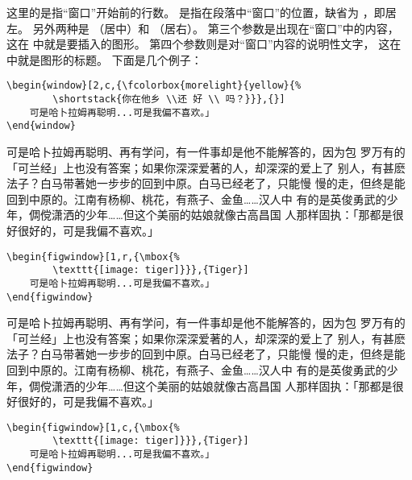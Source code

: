 这里的是指“窗口”开始前的行数。
是指在段落中“窗口”的位置，缺省为 ，即居左。
另外两种是 （居中）和 （居右）。
第三个参数是出现在“窗口”中的内容，
这在  中就是要插入的图形。
第四个参数则是对“窗口”内容的说明性文字，
这在  中就是图形的标题。
下面是几个例子：

\begin{Verbatim}
\begin{window}[2,c,{\fcolorbox{morelight}{yellow}{%
		\shortstack{你在他乡 \\还 好 \\ 吗？}}},{}]
	可是哈卜拉姆再聪明...可是我偏不喜欢。」
\end{window}
\end{Verbatim}

\begin{window}
	可是哈卜拉姆再聪明、再有学问，有一件事却是他不能解答的，因为包
	罗万有的「可兰经」上也没有答案；如果你深深爱著的人，却深深的爱上了
	别人，有甚麽法子？白马带著她一步步的回到中原。白马已经老了，只能慢
	慢的走，但终是能回到中原的。江南有杨柳、桃花，有燕子、金鱼……汉人中
	有的是英俊勇武的少年，倜傥潇洒的少年……但这个美丽的姑娘就像古高昌国
	人那样固执：「那都是很好很好的，可是我偏不喜欢。」
\end{window}

\begin{Verbatim}
\begin{figwindow}[1,r,{\mbox{%
		\texttt{[image: tiger]}}},{Tiger}]
	可是哈卜拉姆再聪明...可是我偏不喜欢。」
\end{figwindow}
\end{Verbatim}

\begin{figwindow}
	可是哈卜拉姆再聪明、再有学问，有一件事却是他不能解答的，因为包
	罗万有的「可兰经」上也没有答案；如果你深深爱著的人，却深深的爱上了
	别人，有甚麽法子？白马带著她一步步的回到中原。白马已经老了，只能慢
	慢的走，但终是能回到中原的。江南有杨柳、桃花，有燕子、金鱼……汉人中
	有的是英俊勇武的少年，倜傥潇洒的少年……但这个美丽的姑娘就像古高昌国
	人那样固执：「那都是很好很好的，可是我偏不喜欢。」
\end{figwindow}

\begin{Verbatim}
\begin{figwindow}[1,c,{\mbox{%
		\texttt{[image: tiger]}}},{Tiger}]
	可是哈卜拉姆再聪明...可是我偏不喜欢。」
\end{figwindow}
\end{Verbatim}

